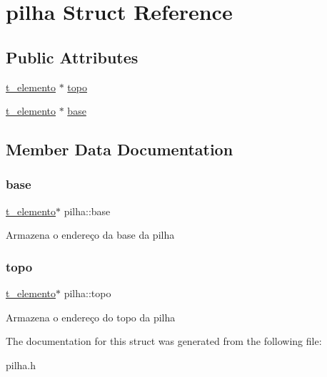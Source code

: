 \hypertarget{structpilha}{}\section{pilha Struct Reference}
\label{structpilha}
\subsection*{Public Attributes}
\begin{DoxyCompactItemize}
\item 
\mbox{\hyperlink{structelemento}{t\+\_\+elemento}} $\ast$ \mbox{\hyperlink{structpilha_ac636e723ce248e1789b4c79c51c7ab97}{topo}}
\item 
\mbox{\hyperlink{structelemento}{t\+\_\+elemento}} $\ast$ \mbox{\hyperlink{structpilha_a3360c875ff3de71a7a6c818aaf3e883f}{base}}
\end{DoxyCompactItemize}


\subsection{Member Data Documentation}
\mbox{\label{structpilha_a3360c875ff3de71a7a6c818aaf3e883f}} 
\subsubsection{\texorpdfstring{base}{base}}
{\footnotesize\ttfamily \mbox{\hyperlink{structelemento}{t\+\_\+elemento}}$\ast$ pilha\+::base}

Armazena o endereço da base da pilha \mbox{\label{structpilha_ac636e723ce248e1789b4c79c51c7ab97}} 
\subsubsection{\texorpdfstring{topo}{topo}}
{\footnotesize\ttfamily \mbox{\hyperlink{structelemento}{t\+\_\+elemento}}$\ast$ pilha\+::topo}

Armazena o endereço do topo da pilha 

The documentation for this struct was generated from the following file\+:\begin{DoxyCompactItemize}
\item 
pilha.\+h\end{DoxyCompactItemize}
